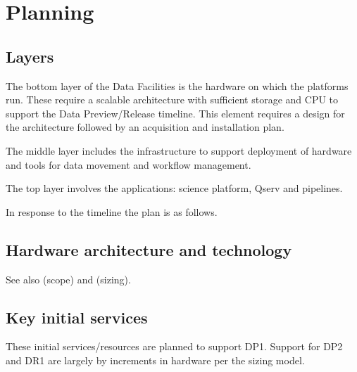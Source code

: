 \section{Planning}\label{sec:plan}

\subsection{Layers}

The bottom layer of the Data Facilities is the hardware on which the
platforms run. These require a scalable architecture with sufficient
storage and \gls{CPU} to support the Data Preview/Release timeline.  This
element requires a design for the architecture followed by an
acquisition and installation plan.

The middle layer includes the infrastructure to support deployment of
hardware and tools for data movement and workflow management.

 The top layer involves the applications: science platform, \gls{Qserv} and pipelines.

In response to the timeline  the plan is as follows.

\subsection {Hardware architecture and technology}
See also  (scope) and   (sizing).

\subsection{Key initial services}

These initial services/resources are planned to support \gls{DP1}. Support
for \gls{DP2} and DR1 are largely by increments in hardware per the sizing model.

